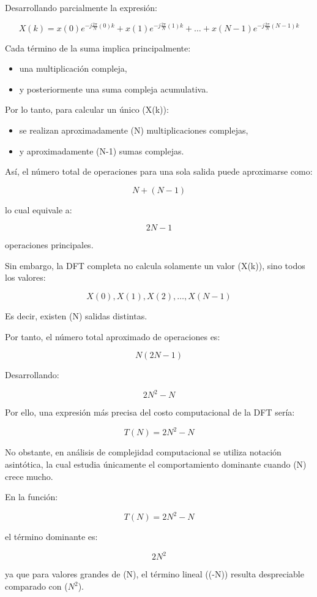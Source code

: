 \documentclass[12pt]{article}
\begin{document}
Desarrollando parcialmente la expresión:

$$
X(k)=
x(0)e^{-j\frac{2\pi}{N}(0)k}
+
x(1)e^{-j\frac{2\pi}{N}(1)k}
+\dots+
x(N-1)e^{-j\frac{2\pi}{N}(N-1)k}
$$

Cada término de la suma implica principalmente:

\begin{itemize}
\item una multiplicación compleja,
\item y posteriormente una suma compleja acumulativa.
\end{itemize}

Por lo tanto, para calcular un único (X(k)):

\begin{itemize}
\item se realizan aproximadamente (N) multiplicaciones complejas,
\item y aproximadamente (N-1) sumas complejas.
\end{itemize}

Así, el número total de operaciones para una sola salida puede aproximarse como:

$$
N+(N-1)
$$

lo cual equivale a:

$$
2N-1
$$

operaciones principales.

Sin embargo, la DFT completa no calcula solamente un valor (X(k)), sino todos los valores:

$$
X(0),X(1),X(2),\dots,X(N-1)
$$

Es decir, existen (N) salidas distintas.

Por tanto, el número total aproximado de operaciones es:

$$
N(2N-1)
$$

Desarrollando:

$$
2N^2-N
$$

Por ello, una expresión más precisa del costo computacional de la DFT sería:

$$
T(N)=2N^2-N
$$

No obstante, en análisis de complejidad computacional se utiliza notación asintótica, la cual estudia únicamente el comportamiento dominante cuando (N) crece mucho.

En la función:

$$
T(N)=2N^2-N
$$

el término dominante es:

$$
2N^2
$$

ya que para valores grandes de (N), el término lineal ((-N)) resulta despreciable comparado con ($N^2$).
\end{document}

